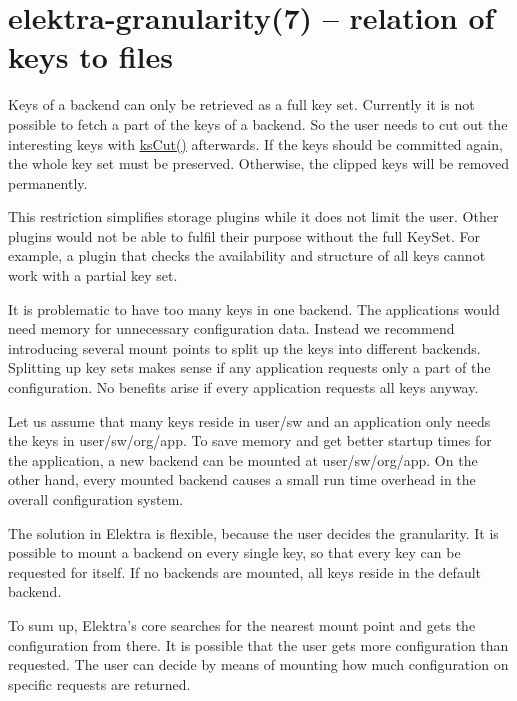 \section*{elektra-\/granularity(7) -- relation of keys to files }

Keys of a backend can only be retrieved as a full key set. Currently it is not possible to fetch a part of the keys of a backend. So the user needs to cut out the interesting keys with {\ttfamily \hyperlink{group__keyset_ga6b00cf82b59af4d883a9bad6cf4a4a4a}{ks\+Cut()}} afterwards. If the keys should be committed again, the whole key set must be preserved. Otherwise, the clipped keys will be removed permanently.

This restriction simplifies storage plugins while it does not limit the user. Other plugins would not be able to fulfil their purpose without the full {\ttfamily Key\+Set}. For example, a plugin that checks the availability and structure of all keys cannot work with a partial key set.

It is problematic to have too many keys in one backend. The applications would need memory for unnecessary configuration data. Instead we recommend introducing several mount points to split up the keys into different backends. Splitting up key sets makes sense if any application requests only a part of the configuration. No benefits arise if every application requests all keys anyway.

Let us assume that many keys reside in {\ttfamily user/sw} and an application only needs the keys in {\ttfamily user/sw/org/app}. To save memory and get better startup times for the application, a new backend can be mounted at {\ttfamily user/sw/org/app}. On the other hand, every mounted backend causes a small run time overhead in the overall configuration system.

The solution in Elektra is flexible, because the user decides the granularity. It is possible to mount a backend on every single key, so that every key can be requested for itself. If no backends are mounted, all keys reside in the default backend.

To sum up, Elektra's core searches for the nearest mount point and gets the configuration from there. It is possible that the user gets more configuration than requested. The user can decide by means of mounting how much configuration on specific requests are returned. 